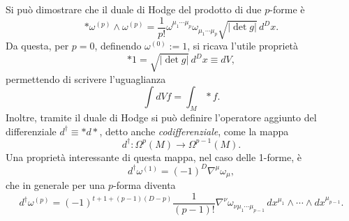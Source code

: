 Si può dimostrare che il duale di Hodge del prodotto di due $p$-forme è
\begin{equation}
    * \omega^{(p)}\wedge\omega^{(p)} = \frac{1}{p!}\omega^{\mu_1\cdots\mu_p}\omega_{\mu_1\cdots\mu_p}\sqrt{|\det{g}|}\,d^Dx.
\end{equation}
Da questa, per $p = 0$, definendo $\omega^{(0)} := 1$, si ricava l'utile proprietà 
\begin{equation}
    * 1 = \sqrt{|\det{g}|}\,d^Dx \equiv dV,
\end{equation}
permettendo di scrivere l'uguaglianza
\begin{equation}
    \int dV f = \int_M*f.
\end{equation}
Inoltre, tramite il duale di Hodge si può definire l'operatore aggiunto del differenziale $d^\dag \equiv *d*$, detto anche \emph{codifferenziale}, come la mappa
\begin{equation}
    d^\dag : \Omega^p(M) \to \Omega^{p - 1}(M).
\end{equation}
Una proprietà interessante di questa mappa, nel caso delle 1-forme, è
\begin{equation}
    d^\dag\omega^{(1)} = (-1)^D\nabla^\mu\omega_\mu,
\end{equation}
che in generale per una $p$-forma diventa
\begin{equation}
    d^\dag\omega^{(p)} = (-1)^{t + 1 + (p - 1)(D - p)}\frac{1}{(p - 1)!}\nabla^\nu\omega_{\nu\mu_1\cdots\mu_{p - 1}}\,dx^{\mu_1}\wedge \cdots \wedge dx^{\mu_{p - 1}}.
\end{equation}

